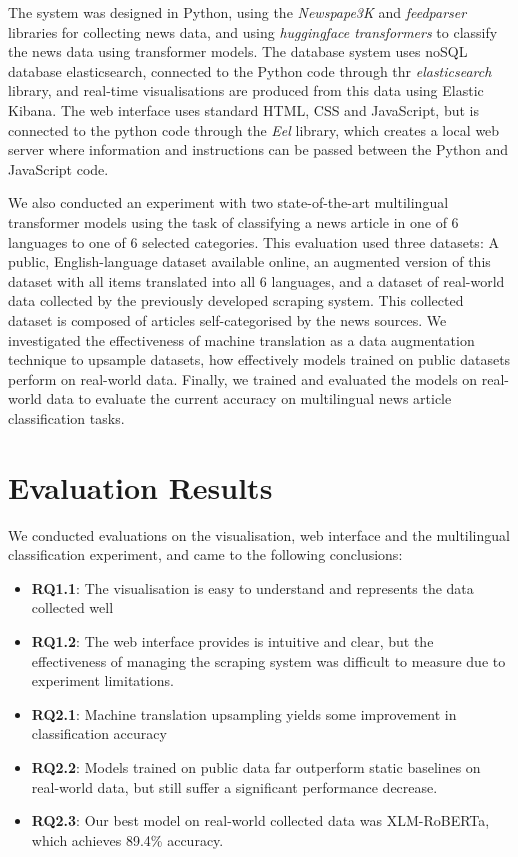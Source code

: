\documentclass{l4proj}
\begin{document}
The system was designed in Python, using the \emph{Newspape3K} and \emph{feedparser} libraries for collecting news data, and using \emph{huggingface transformers} to classify the news data using transformer models. The database system uses noSQL database elasticsearch, connected to the Python code through thr \emph{elasticsearch} library, and real-time visualisations are produced from this data using Elastic Kibana. The web interface uses standard HTML, CSS and JavaScript, but is connected to the python code through the \emph{Eel} library, which creates a local web server where information and instructions can be passed between the Python and JavaScript code.

We also conducted an experiment with two state-of-the-art multilingual transformer models using the task of classifying a news article in one of 6 languages to one of 6 selected categories. This evaluation used three datasets: A public, English-language dataset available online, an augmented version of this dataset with all items translated into all 6 languages, and a dataset of real-world data collected by the previously developed scraping system. This collected dataset is composed of articles self-categorised by the news sources. We investigated the effectiveness of machine translation as a data augmentation technique to upsample datasets, how effectively models trained on public datasets perform on real-world data. Finally, we trained and evaluated the models on real-world data to evaluate the current accuracy on multilingual news article classification tasks.

\section{Evaluation Results}
We conducted evaluations on the visualisation, web interface and the multilingual classification experiment, and came to the following conclusions:
\begin{itemize}
    \item \textbf{RQ1.1}: The visualisation is easy to understand and represents the data collected well
    \item \textbf{RQ1.2}: The web interface provides is intuitive and clear, but the effectiveness of managing the scraping system was difficult to measure due to experiment limitations.
    \item \textbf{RQ2.1}: Machine translation upsampling yields some improvement in classification accuracy
    \item \textbf{RQ2.2}: Models trained on public data far outperform static baselines on real-world data, but still suffer a significant performance decrease.
    \item \textbf{RQ2.3}: Our best model on real-world collected data  was XLM-RoBERTa, which achieves 89.4\% accuracy.
\end{itemize}
\end{document}
